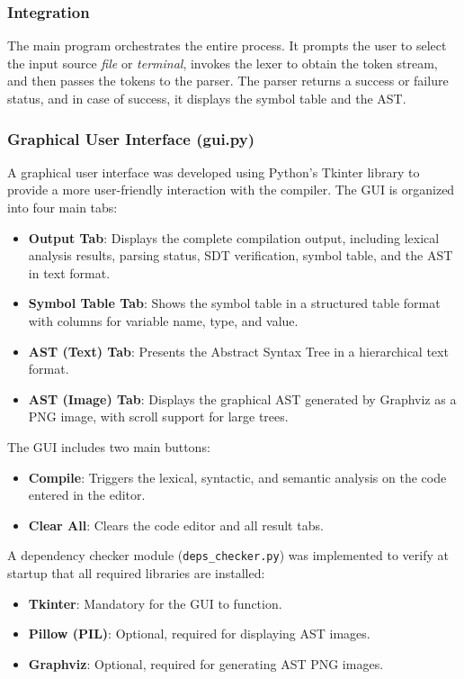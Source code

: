 \documentclass[letterpaper,12pt,oneside]{article}
\begin{document}
\subsubsection{Integration}

The main program orchestrates the entire process. It prompts the user to select the input source \textit{file} or \textit{terminal}, invokes the lexer to obtain the token stream, and then passes the tokens to the parser. The parser returns a success or failure status, and in case of success, it displays the symbol table and the AST.

\subsubsection{Graphical User Interface (gui.py)}

	A graphical user interface was developed using Python's Tkinter library to provide a more user-friendly interaction with the compiler. The GUI is organized into four main tabs:
	
	\begin{itemize}
		\item \textbf{Output Tab}: Displays the complete compilation output, including lexical analysis results, parsing status, SDT verification, symbol table, and the AST in text format.
		\item \textbf{Symbol Table Tab}: Shows the symbol table in a structured table format with columns for variable name, type, and value.
		\item \textbf{AST (Text) Tab}: Presents the Abstract Syntax Tree in a hierarchical text format.
		\item \textbf{AST (Image) Tab}: Displays the graphical AST generated by Graphviz as a PNG image, with scroll support for large trees.
	\end{itemize}
	
	The GUI includes two main buttons:
	\begin{itemize}
		\item \textbf{Compile}: Triggers the lexical, syntactic, and semantic analysis on the code entered in the editor.
		\item \textbf{Clear All}: Clears the code editor and all result tabs.
	\end{itemize}
	
	A dependency checker module (\texttt{deps\_checker.py}) was implemented to verify at startup that all required libraries are installed:
	\begin{itemize}
		\item \textbf{Tkinter}: Mandatory for the GUI to function.
		\item \textbf{Pillow (PIL)}: Optional, required for displaying AST images.
		\item \textbf{Graphviz}: Optional, required for generating AST PNG images.
	\end{itemize}
\end{document}

